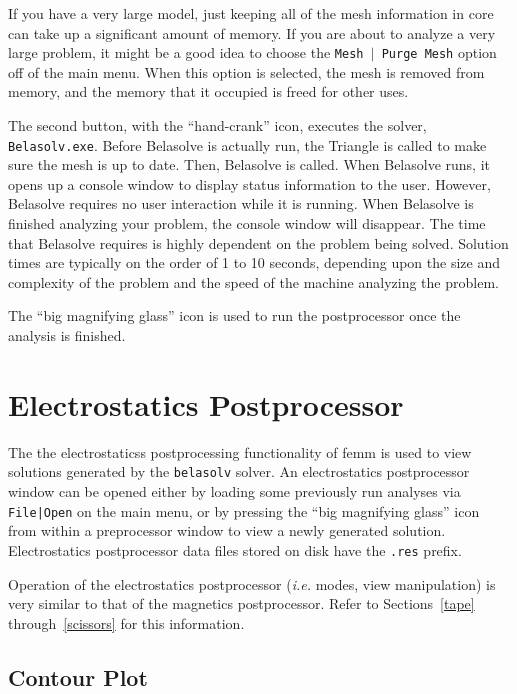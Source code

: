 \documentclass[12pt]{report}
\begin{document}
If you have a very large model, just keeping all of the mesh
information in core can take up a significant amount of memory. If
you are about to analyze a very large problem, it might be a good
idea to choose the \texttt{Mesh $\vert $ Purge Mesh} option off of
the main menu. When this option is selected, the mesh is removed
from memory, and the memory that it occupied is freed for other
uses.

The second button, with the ``hand-crank'' icon, executes the solver,
\texttt{Belasolv.exe}. Before Belasolve is actually run, the Triangle is
called to make sure the mesh is up to date. Then, Belasolve is called. When
Belasolve runs, it opens up a console window to display status information
to the user. However, Belasolve requires no user interaction while it is
running. When Belasolve is finished analyzing your problem, the console
window will disappear. The time that Belasolve requires is highly dependent
on the problem being solved. Solution times are typically on the order of 1
to 10 seconds, depending upon the size and complexity of the problem and the
speed of the machine analyzing the problem.

The ``big magnifying glass'' icon is used to run the postprocessor once the
analysis is finished.



\section{Electrostatics Postprocessor}


The the electrostaticss postprocessing functionality of femm is
used to view solutions generated by the {\tt belasolv} solver.  An
electrostatics postprocessor window can be opened either by loading
some previously run analyses via {\tt File|Open} on the main menu,
or by pressing the ``big magnifying glass'' icon from within a
preprocessor window to view a newly generated solution.
Electrostatics postprocessor data files stored on disk have the
{\tt .res} prefix.

Operation of the electrostatics postprocessor ({\em i.e.} modes, view manipulation) is
very similar to that of the magnetics postprocessor.  Refer to
Sections~\ref{tape} through~\ref{scissors} for this information.

\subsection{Contour Plot}
\end{document}
